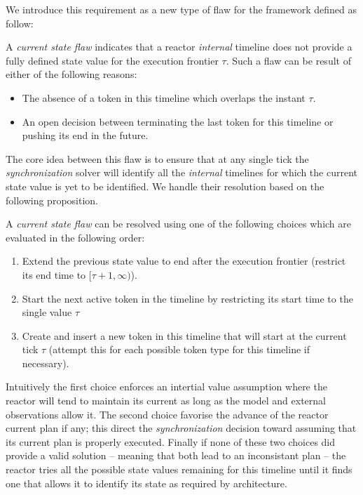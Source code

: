 We introduce this requirement as a new type of flaw for the \eu
framework defined as follow:

\begin{definition}
  \label{def:csf}
  A {\em current state flaw} indicates that a reactor {\em internal}
  timeline does not provide a fully defined state value for the
  execution frontier $\tau$. Such a flaw can be result of either of
  the following reasons:

  \begin{itemize}
  \item The absence of a token in this timeline which overlaps the
    instant $\tau$.
  \item An open decision between terminating the last token for this
    timeline or pushing its end in the future.
  \end{itemize}

\end{definition}

The core idea between this flaw is to ensure that at any single tick
the {\em synchronization} solver will identify all the {\em internal}
timelines for which the current state value is yet to be
identified. We handle their resolution based on the following
proposition.

\begin{proposition}
  \label{prop:csf:resolve}
  A {\em current state flaw} can be resolved using one of the
  following choices which are evaluated in the following order:

  \begin{enumerate}

  \item Extend the previous state value to end after the execution 
    frontier  (\ie restrict its end time to $[\tau+1, \infty)$). %

  \item Start the next active token in the timeline by restricting its
    start time to the single value $\tau$

  \item Create and insert a new token in this timeline that will start
    at the current tick $\tau$ (attempt this for each possible token
    type for this timeline if necessary).

\end{enumerate}
\end{proposition}
Intuitively the first choice enforces an intertial value assumption
where the reactor will tend to maintain its current as long as the
model and external observations allow it. The second choice favorise
the advance of the reactor current plan if any; this direct the {\em
  synchronization} decision toward assuming that its current plan is
properly executed. Finally if none of these two choices did provide a
valid solution -- meaning that both lead to an inconsistant plan --
the reactor tries all the possible state values remaining for this
timeline until it finds one that allows it to identify its state as
required by \rx architecture.

